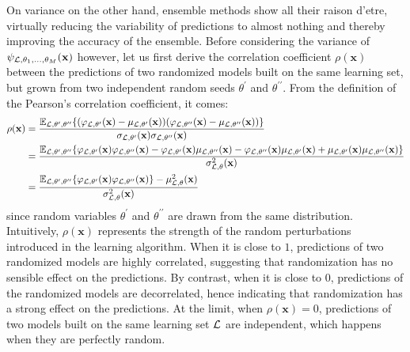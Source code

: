 On variance on the other hand, ensemble methods show all their raison d'etre,
virtually reducing the variability of predictions to almost nothing and thereby
improving the accuracy of the ensemble. Before considering the variance of
$\psi_{{\cal L},\theta_1,\dots,\theta_M}(\mathbf{x})$ however, let us first
derive the correlation coefficient $\rho(\mathbf{x})$ between the predictions
of two randomized models built on the same learning set, but grown from two
independent random seeds $\theta^\prime$ and $\theta^{\prime\prime}$. From the definition of the Pearson's correlation
coefficient, it comes:
\begin{align}
\rho(\mathbf{x}) &= \frac{\mathbb{E}_{{\cal L},\theta^\prime,\theta^{\prime\prime}} \{ (\varphi_{{\cal L}, \theta^\prime}(\mathbf{x}) - \mu_{{\cal L},\theta^\prime}(\mathbf{x})) (\varphi_{{\cal L}, \theta^{\prime\prime}}(\mathbf{x}) - \mu_{{\cal L},\theta^{\prime\prime}}(\mathbf{x})) \}}{\sigma_{{\cal L},\theta^\prime}(\mathbf{x}) \sigma_{{\cal L},\theta^{\prime\prime}}(\mathbf{x})} \nonumber \\
&= \frac{\mathbb{E}_{{\cal L},\theta^\prime,\theta^{\prime\prime}} \{ \varphi_{{\cal L},\theta^\prime}(\mathbf{x}) \varphi_{{\cal L},\theta^{\prime\prime}}(\mathbf{x}) - \varphi_{{\cal L},\theta^\prime}(\mathbf{x}) \mu_{{\cal L},\theta^{\prime\prime}}(\mathbf{x}) - \varphi_{{\cal L},\theta^{\prime\prime}}(\mathbf{x}) \mu_{{\cal L},\theta^\prime}(\mathbf{x}) + \mu_{{\cal L},\theta^\prime}(\mathbf{x}) \mu_{{\cal L},\theta^{\prime\prime}}(\mathbf{x}) \}}{\sigma^2_{{\cal L},\theta}(\mathbf{x})} \nonumber \\
&= \frac{\mathbb{E}_{{\cal L},\theta^\prime,\theta^{\prime\prime}} \{ \varphi_{{\cal L},\theta^\prime}(\mathbf{x}) \varphi_{{\cal L},\theta^{\prime\prime}}(\mathbf{x}) \} - \mu^2_{{\cal L},\theta}(\mathbf{x})}{\sigma^2_{{\cal L},\theta}(\mathbf{x})} \label{eqn:4:correlation}
\end{align}
since random variables $\theta^\prime$ and $\theta^{\prime\prime}$ are drawn from the same
distribution. Intuitively, $\rho(\mathbf{x})$ represents the strength of the
random perturbations introduced in the learning algorithm. When it is close to
$1$, predictions of two randomized models are highly correlated, suggesting
that randomization has no sensible effect on the predictions. By contrast, when
it is close to $0$, predictions of the randomized models are decorrelated,
hence indicating that randomization has a strong effect on the predictions. At
the limit, when $\rho(\mathbf{x})=0$, predictions of two models built on the
same learning set ${\cal L}$ are independent, which happens when they are
perfectly random.

